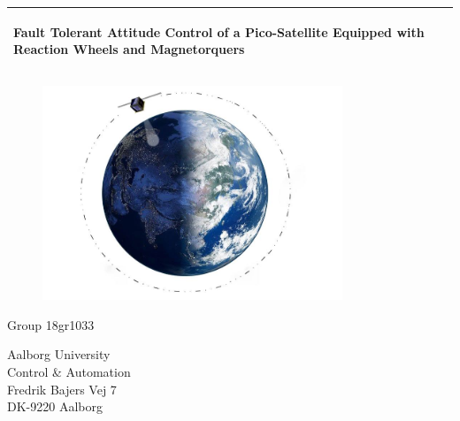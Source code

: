 %
\begin{titlepage}
  \addtolength{\hoffset}{0.5\evensidemargin-0.5\oddsidemargin} %
  \noindent%
  \begin{tabular}{@{}p{\textwidth}@{}}
    \toprule[2pt]
    \midrule
    \vspace{0.2cm}
    \begin{center}
    \Huge{\textbf{
      Fault Tolerant Attitude Control of a Pico-Satellite Equipped with Reaction Wheels
      and Magnetorquers%
    }}
    \end{center}
%
    \vspace{0.2cm}\\
    \midrule
    \toprule[2pt]
  \end{tabular}
   \vspace{0.55 cm}
  \begin{figure}[!ht]
\centering
\includegraphics[width=0.8\textwidth]{figures/cover}
\label{fig:forside}
\end{figure}
  \vspace{0.6 cm}
  \begin{center}
    \vspace{0.2cm}
    {\Large
      Group 18gr1033 %
    }
  \end{center}
  \begin{center}
  Aalborg University\\
  Control \& Automation\\
  Fredrik Bajers Vej 7\\
  DK-9220 Aalborg
  \end{center}
\end{titlepage}

\clearpage